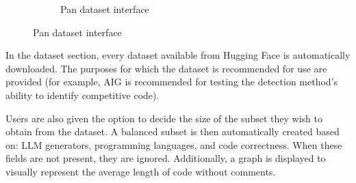 \begin{figure}[H]
\begin{subfigure}[t]{0.45\textwidth}
        \caption{Pan dataset interface}
        \label{fig:ab2sceyg}
    \end{subfigure}
\end{figure}

In the dataset section, every dataset available from Hugging 
Face is automatically downloaded. The purposes for which the 
dataset is recommended for use are provided (for example, AIG 
is recommended for testing the detection method's ability to 
identify competitive code).

Users are also given the option to decide the size of the 
subset they wish to obtain from the dataset. A balanced subset 
is then automatically created based on: LLM generators, 
programming languages, and code correctness. When these 
fields are not present, they are ignored. Additionally, a 
graph is displayed to visually represent the average length 
of code without comments.


